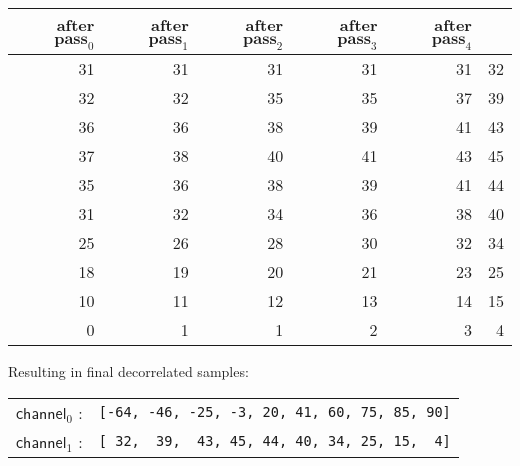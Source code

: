 {{\begin{tabular}{|r|r|r|r|r|r|}
    after $\textbf{pass}_0$ &
    after $\textbf{pass}_1$ &
    after $\textbf{pass}_2$ &
    after $\textbf{pass}_3$ &
    after $\textbf{pass}_4$ \\
    \hline
    31 & 31 & 31 & 31 & 31 & 32 \\
    32 & 32 & 35 & 35 & 37 & 39 \\
    36 & 36 & 38 & 39 & 41 & 43 \\
    37 & 38 & 40 & 41 & 43 & 45 \\
    35 & 36 & 38 & 39 & 41 & 44 \\
    31 & 32 & 34 & 36 & 38 & 40 \\
    25 & 26 & 28 & 30 & 32 & 34 \\
    18 & 19 & 20 & 21 & 23 & 25 \\
    10 & 11 & 12 & 13 & 14 & 15 \\
    0 & 1 & 1 & 2 & 3 & 4 \\
    \hline
  \end{tabular}
}
\par
\noindent
Resulting in final decorrelated samples:
\newline
\begin{tabular}{rr}
$\textsf{channel}_0$ : & \texttt{[-64,~-46,~-25,~-3,~20,~41,~60,~75,~85,~90]} \\
$\textsf{channel}_1$ : & \texttt{[~32,~~39,~~43,~45,~44,~40,~34,~25,~15,~~4]} \\
\end{tabular}

\clearpage

}
